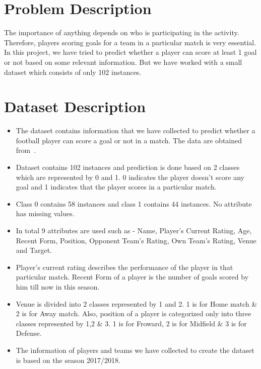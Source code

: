 \documentclass[10pt,a4paper]{article}
\begin{document}
\section{Problem Description}
The importance of anything depends on who is participating in the activity. Therefore, players scoring goals for a team in a particular match is very essential. In this project, we have tried to predict whether a player can score at least 1 goal or not based on some relevant information. But we have worked with a small dataset which consists of only 102 instances.

\section{Dataset Description}
\begin{itemize}
    \item The dataset contains information that we have collected to predict whether a football player can score a goal or not in a match. The data are obtained from~\cite{a}.
    
    \item Dataset contains 102 instances and prediction is done based on 2 classes which are represented by 0 and 1. 0 indicates the player doesn't score any goal and 1 indicates that the player scores in a particular match.
    
    \item Class 0 contains 58 instances and class 1 contains 44 instances. No attribute has missing values.
    
    \item In total 9 attributes are used such as - Name, Player's Current Rating, Age, Recent Form, Position, Opponent Team's Rating, Own Team's Rating, Venue and Target.
    
    \item Player's current rating describes the performance of the player in that particular match. Recent Form of a player is the number of goals scored by him till now in this season.
    
    \item Venue is divided into 2 classes represented by 1 and 2. 1 is for Home match \& 2 is for Away match. Also, position of a player is categorized only into three classes represented by 1,2 \& 3. 1 is for Froward, 2 is for Midfield \& 3 is for Defense.  
    
    \item The information of players and teams we have collected to create the dataset is based on the season 2017/2018.
\end{itemize}
\end{document}
